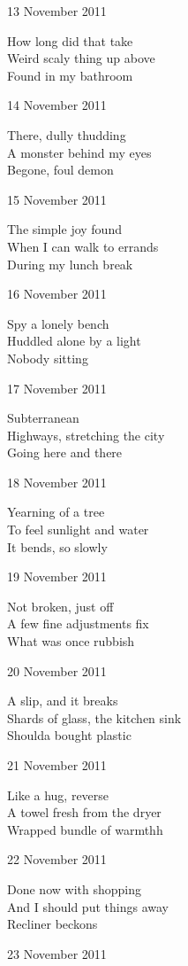 \documentclass[12pt]{article}
\begin{document}
13 November 2011

How long did that take \\
Weird scaly thing up above \\
Found in my bathroom

14 November 2011

There, dully thudding \\
A monster behind my eyes \\
Begone, foul demon

15 November 2011

The simple joy found \\
When I can walk to errands \\
During my lunch break

16 November 2011

Spy a lonely bench \\
Huddled alone by a light \\
Nobody sitting

\newpage

17 November 2011

Subterranean \\
Highways, stretching the city \\
Going here and there

18 November 2011
 
Yearning of a tree \\
To feel sunlight and water \\
It bends, so slowly

19 November 2011

Not broken, just off \\
A few fine adjustments fix \\
What was once rubbish

20 November 2011

A slip, and it breaks \\
Shards of glass, the kitchen sink \\
Shoulda bought plastic

21 November 2011

Like a hug, reverse \\
A towel fresh from the dryer \\
Wrapped bundle of warmthh

22 November 2011

Done now with shopping \\
And I should put things away \\
Recliner beckons

23 November 2011
\end{document}
